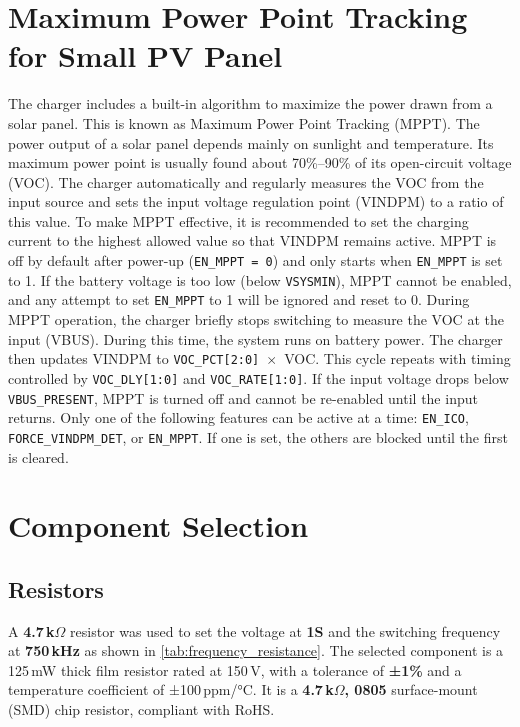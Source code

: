 \documentclass[12pt]{article}
\begin{document}
\section{Maximum Power Point Tracking for Small PV Panel}

The charger includes a built-in algorithm to maximize the power drawn from a solar panel. This is known as Maximum Power Point Tracking (MPPT). The power output of a solar panel depends mainly on sunlight and temperature. Its maximum power point is usually found about 70\%--90\% of its open-circuit voltage (VOC).
The charger automatically and regularly measures the VOC from the input source and sets the input voltage regulation point (VINDPM) to a ratio of this value. To make MPPT effective, it is recommended to set the charging current to the highest allowed value so that VINDPM remains active. MPPT is off by default after power-up (\texttt{EN\_MPPT = 0}) and only starts when \texttt{EN\_MPPT} is set to 1.
If the battery voltage is too low (below \texttt{VSYSMIN}), MPPT cannot be enabled, and any attempt to set \texttt{EN\_MPPT} to 1 will be ignored and reset to 0.
During MPPT operation, the charger briefly stops switching to measure the VOC at the input (VBUS). During this time, the system runs on battery power. The charger then updates VINDPM to \texttt{VOC\_PCT[2:0]}~$\times$~VOC. This cycle repeats with timing controlled by \texttt{VOC\_DLY[1:0]} and \texttt{VOC\_RATE[1:0]}.
If the input voltage drops below \texttt{VBUS\_PRESENT}, MPPT is turned off and cannot be re-enabled until the input returns.
Only one of the following features can be active at a time: \texttt{EN\_ICO}, \texttt{FORCE\_VINDPM\_DET}, or \texttt{EN\_MPPT}. If one is set, the others are blocked until the first is cleared.

\section{Component Selection}

\subsection{Resistors}
A \textbf{4.7\,k\(\Omega\)} resistor was used to set the voltage at \textbf{ 1S} and the switching frequency at \textbf{ 750\,kHz} as shown in \autoref{tab:frequency_resistance}.
The selected component is a 125\,mW thick film resistor rated at 150\,V, with a tolerance of \textbf{±1\%} and a temperature coefficient of ±100\,ppm/°C. It is a \textbf{4.7\,k\(\Omega\), 0805} surface-mount (SMD) chip resistor, compliant with RoHS.
\end{document}
